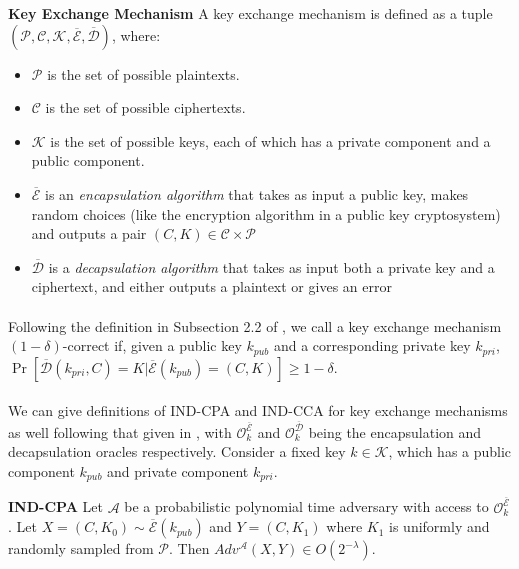\begin{definition}{\textbf{Key Exchange Mechanism}}
A key exchange mechanism is defined as a tuple $(\mathcal{P}, \mathcal{C}, \mathcal{K}, \overline{\mathcal{E}}, \overline{\mathcal{D}})$, where:
\begin{itemize}
    \item $\mathcal{P}$ is the set of possible plaintexts.
    \item $\mathcal{C}$ is the set of possible ciphertexts.
    \item $\mathcal{K}$ is the set of possible keys, each of which has a private component and a public component.
    \item $\overline{\mathcal{E}}$ is an \textit{encapsulation algorithm} that takes as input a public key, makes random choices (like the encryption algorithm in a public key cryptosystem) and outputs a pair $(C, K) \in \mathcal{C} \times \mathcal{P}$
    \item $\overline{\mathcal{D}}$ is a \textit{decapsulation algorithm} that takes as input both a private key and a ciphertext, and either outputs a plaintext or gives an error
\end{itemize}
\end{definition}

\paragraph{}
Following the definition in Subsection 2.2 of \cite{aggarwal2018new}, we call a key exchange mechanism $(1 - \delta)$-correct if, given a public key $k_{pub}$ and a corresponding private key $k_{pri}$, $\Pr[\overline{\mathcal{D}}(k_{pri}, C) = K | \overline{\mathcal{E}}(k_{pub}) = (C, K)] \geq 1 - \delta$.

\paragraph{}
We can give definitions of IND-CPA and IND-CCA for key exchange mechanisms as well following that given in \cite{aggarwal2018new}, with $\mathcal{O}_k^{\overline{\mathcal{E}}}$ and $\mathcal{O}_k^{\overline{\mathcal{D}}}$ being the encapsulation and decapsulation oracles respectively. Consider a fixed key $k \in \mathcal{K}$, which has a public component $k_{pub}$ and private component $k_{pri}$.

\theoremstyle{definition}
\begin{definition}{\textbf{IND-CPA}}
Let $\mathcal{A}$ be a probabilistic polynomial time adversary with access to $\mathcal{O}_k^{\overline{\mathcal{E}}}$. Let $X = (C, K_0) \sim \overline{\mathcal{E}}(k_{pub})$ and $Y = (C, K_1)$ where $K_1$ is uniformly and randomly sampled from $\mathcal{P}$. Then $Adv^\mathcal{A}(X, Y) \in O(2^{-\lambda})$.
\end{definition}

